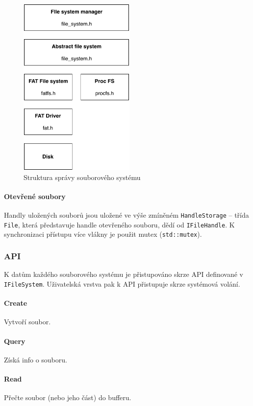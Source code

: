\documentclass[11pt,a4paper]{scrartcl}
\begin{document}
	\begin{figure}[H]
		\centering
		\includegraphics[height=9cm]{fs-layers.pdf}
		\caption{Struktura správy souborového systému}
		\label{fig:fs-layers}
	\end{figure}

	\paragraph{Otevřené soubory} Handly uložených souborů jsou uložené ve výše zmíněném \verb|HandleStorage| -- třída \verb|File|, která představuje handle otevřeného souboru, dědí od \verb|IFileHandle|. K synchronizaci přístupu více vlákny je použit mutex (\verb|std::mutex|). 
	
	\subsubsection{API}
	K datům každého souborového systému je přistupováno skrze API definované v \verb|IFileSystem|. Uživatelská vrstva pak k API přistupuje skrze systémová volání.
	
	\paragraph{Create}
	Vytvoří soubor.
	
	\paragraph{Query}
	Získá info o souboru.
	
	\paragraph{Read}
	Přečte soubor (nebo jeho část) do bufferu.
	
\end{document}
